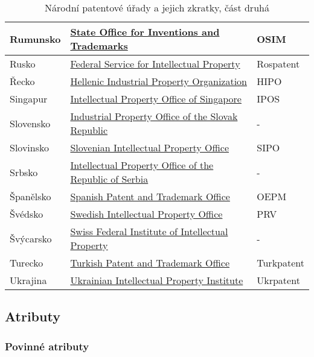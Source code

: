 \begin{table}[H]
\begin{tabular}{|>{\centering\arraybackslash}p{2.2cm}|>{\centering\arraybackslash}p{8cm}|>{\centering\arraybackslash}p{2cm}|}
	\hline
	Rumunsko & \href{http://www.osim.ro/}{State Office for Inventions and Trademarks}  & OSIM         \\ 
	\hline
	Rusko & \href{https://rospatent.gov.ru/}{Federal Service for Intellectual Property}  & Rospatent         \\ 
	\hline
	Řecko & \href{http://www.obi.gr/el/}{Hellenic Industrial Property Organization}  & HIPO         \\ 
	\hline
	Singapur & \href{http://www.ipos.gov.sg/}{Intellectual Property Office of Singapore}  & IPOS         \\ 
	\hline
	Slovensko & \href{https://www.indprop.gov.sk/}{Industrial Property Office of the Slovak Republic}  & -         \\ 
	\hline
	Slovinsko & \href{http://www.uil-sipo.si/}{Slovenian Intellectual Property Office}  & SIPO         \\ 
	\hline
	Srbsko & \href{http://www.zis.gov.rs/}{Intellectual Property Office of the Republic of Serbia}  & -         \\ 
	\hline
	Španělsko & \href{http://www.oepm.es/}{Spanish Patent and Trademark Office}  & OEPM         \\ 
	\hline
	Švédsko & \href{http://www.prv.se/}{Swedish Intellectual Property Office}  & PRV         \\ 
	\hline
	Švýcarsko & \href{https://www.ige.ch/}{Swiss Federal Institute of Intellectual Property}  & -         \\ 
	\hline
	Turecko & \href{http://www.turkpatent.gov.tr/}{Turkish Patent and Trademark Office}  & Turkpatent         \\ 
	\hline
	Ukrajina & \href{https://ukrpatent.org/en}{Ukrainian Intellectual Property Institute}  & Ukrpatent         \\ 
	\hline
	\end{tabular}
	\caption{Národní patentové úřady a jejich zkratky, část druhá}
	\label{tab:table_offices2}
	\end{table}

\newpage

\subsection{Atributy}\label{subsec:atributy}
\subsubsection{Povinné atributy}

